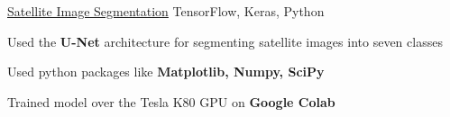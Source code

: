 

\begin{cventries}


  \projects
    {} %
    {\href{https://github.com/Nilanshrajput/interiit_techmeet}{Satellite Image Segmentation}} %
    {TensorFlow, Keras, Python} %
    {} %
    {
      \begin{cvitems} %
        \item {Used the \textbf{U-Net} architecture for segmenting satellite images into seven classes}
        \item {Used python packages like \textbf{Matplotlib, Numpy, SciPy}}
        \item {Trained model over the Tesla K80 GPU on \textbf{Google Colab}}
      \end{cvitems}
    }


\end{cventries}
